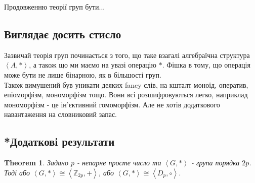 \documentclass[a4paper, 10pt]{article}
\theoremstyle{theoremdd}
\newtheorem{theorem}{Theorem}[subsection]
\theoremstyle{theoremdd}
\theoremstyle{theoremdd}
\theoremstyle{theoremdd}
\theoremstyle{theoremdd}
\theoremstyle{theoremdd}
\theoremstyle{theoremdd}
\theoremstyle{theoremdd}
\theoremstyle{theoremdd}
\theoremstyle{theoremdd}
\theoremstyle{theoremdd}
\theoremstyle{theoremdd}
\theoremstyle{theoremdd}
\theoremstyle{theoremdd}
\theoremstyle{theoremdd}
\begin{document}
Продовженню теорії груп бути...

\subsection*{Виглядає досить стисло}
Зазвичай теорія груп починається з того, що таке взагалі алгебраїчна структура $\left<A,* \right>$, а також що ми маємо на увазі операцію $*$. Фішка в тому, що операція може бути не лише бінарною, як в більшості груп.\\
Також вимушений був уникати деяких fancy слів, на кшталт моноїд, оператив, епіоморфізм, мономорфізм тощо. Вони всі розшифровуються легко, наприклад мономорфізм - це ін'єктивний гомоморфізм. Але не хотів додаткового навантаження на словниковий запас.
\newpage
\subsection{*Додаткові результати}
\begin{theorem}
Задано $p$ - непарне просте число та $\left< G, * \right>$ - група порядка $2p$.\\
Тоді або $\left< G, * \right> \cong \left< \mathbb{Z}_{2p},+ \right>$, або $\left< G, * \right> \cong \left< D_{p},\circ \right>$.
\end{theorem}
\end{document}
